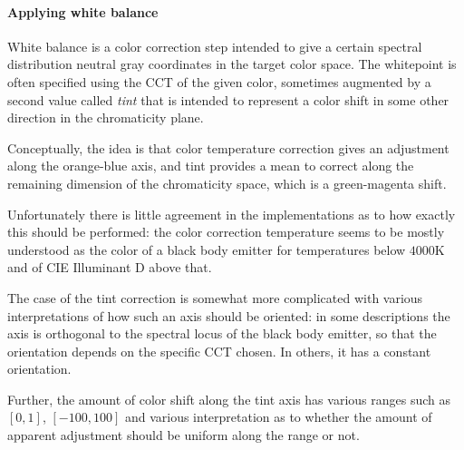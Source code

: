 %   

\paragraph{Applying white balance}
White balance is a color correction step intended to give a certain spectral distribution 
 neutral gray coordinates in the target color space.
The whitepoint is often specified using the \gls{CCT} of the given color,
sometimes augmented by a second value called \textsl{tint} that is intended to represent a color shift 
in some other direction in the chromaticity plane. 
    
Conceptually, the idea is that color temperature correction gives an adjustment along the orange-blue axis, 
and tint provides a mean to correct along the remaining dimension of the chromaticity space, 
which is a green-magenta shift.

Unfortunately there is little agreement in the implementations as to how exactly this should be performed:
the color correction temperature seems to be mostly understood as the color of a black body emitter for
temperatures below $4000\unit{\kelvin}$ and of \gls{CIE} Illuminant D above that. 

The case of the tint correction is somewhat more complicated with various interpretations 
of how such an axis should be oriented: in some descriptions the axis is orthogonal to the 
spectral locus of the black body emitter, so that the orientation depends on the specific 
\gls{CCT} chosen. In others, it has a constant orientation. 

Further, the amount of color shift along the tint axis has various ranges such as $[0,1]$, 
$[-100,100]$ and various interpretation as to whether the amount of apparent adjustment should be 
uniform along the range or not.

